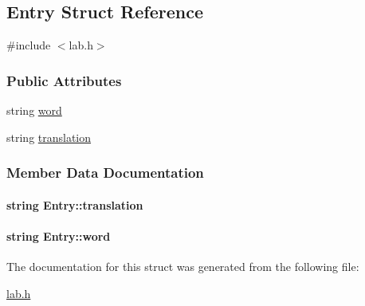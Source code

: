 \hypertarget{structEntry}{\subsection{Entry Struct Reference}
\label{structEntry}
}


{\ttfamily \#include $<$lab.\+h$>$}

\subsubsection*{Public Attributes}
\begin{DoxyCompactItemize}
\item 
string \hyperlink{structEntry_ae91060385d9c045faed5fa24d81be352}{word}
\item 
string \hyperlink{structEntry_a5d913292c5db3101b0f903e7bcd21b8d}{translation}
\end{DoxyCompactItemize}


\subsubsection{Member Data Documentation}
\hypertarget{structEntry_a5d913292c5db3101b0f903e7bcd21b8d}{
\paragraph[{translation}]{\setlength{\rightskip}{0pt plus 5cm}string Entry\+::translation}}\label{structEntry_a5d913292c5db3101b0f903e7bcd21b8d}
\hypertarget{structEntry_ae91060385d9c045faed5fa24d81be352}{
\paragraph[{word}]{\setlength{\rightskip}{0pt plus 5cm}string Entry\+::word}}\label{structEntry_ae91060385d9c045faed5fa24d81be352}


The documentation for this struct was generated from the following file\+:\begin{DoxyCompactItemize}
\item 
\hyperlink{lab_8h}{lab.\+h}\end{DoxyCompactItemize}
